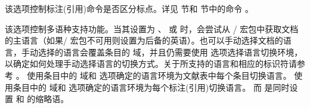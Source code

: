 \begin{optionlist}


该选项控制标注(引用)命令是否区分标点。详见  节和  节中的命令 。


该选项控制多语种支持功能。当其设置为 、 或  时，\biblatex 会尝试从 / 宏包中获取文档的主语言（如果/ 宏包不可用则设置为后备的英语）。也可以手动选择文档的语言，手动选择的语言会覆盖条目的  域，并且仍需要使用  选项选择语言切换环境，以确定如何处理手动选择语言的切换方式。关于所支持的语言和相应的标识符请参考 。
 使用条目中的  域和  选项确定的语言环境为文献表中每个条目切换语言。
 使用条目中的  域和  选项确定的语言环境为每个标注(引用)切换语言。
而  是同时设置  和  的缩略语。




\end{optionlist}
